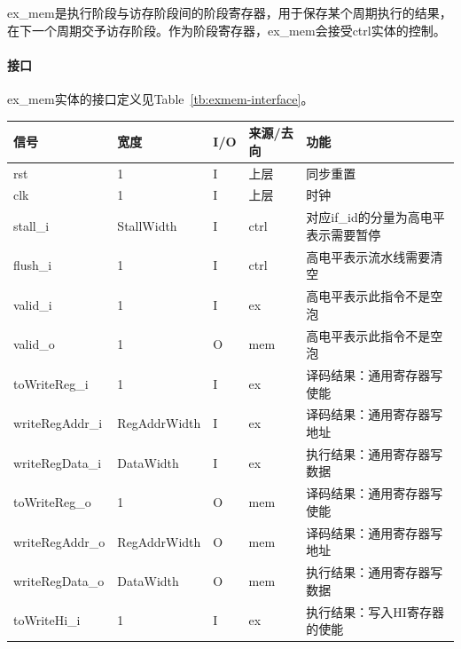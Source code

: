 \documentclass{article}
\begin{document}
\begin{spacing}{1.4}
ex\_mem是执行阶段与访存阶段间的阶段寄存器，用于保存某个周期执行的结果，在下一个周期交予访存阶段。作为阶段寄存器，ex\_mem会接受ctrl实体的控制。

\paragraph{接口}\mbox{}

ex\_mem实体的接口定义见Table~\ref{tb:exmem-interface}。
\begin{longtable}{l|l|l|l|p{5cm}}
\hline
\textbf{信号}&\textbf{宽度}&\textbf{I/O}&\textbf{来源/去向}&\textbf{功能} \\
\hline \endhead rst            & 1                      & I     & 上层          & 同步重置 \\
\hline clk                     & 1                      & I     & 上层          & 时钟 \\
\hline stall\_i                & StallWidth             & I     & ctrl          & 对应if\_id的分量为高电平表示需要暂停 \\
\hline flush\_i                & 1                      & I     & ctrl          & 高电平表示流水线需要清空 \\
\hline valid\_i                & 1                      & I     & ex            & 高电平表示此指令不是空泡 \\
\hline valid\_o                & 1                      & O     & mem           & 高电平表示此指令不是空泡 \\
\hline toWriteReg\_i           & 1                      & I     & ex            & 译码结果：通用寄存器写使能 \\
\hline writeRegAddr\_i         & RegAddrWidth           & I     & ex            & 译码结果：通用寄存器写地址 \\
\hline writeRegData\_i         & DataWidth              & I     & ex            & 执行结果：通用寄存器写数据 \\
\hline toWriteReg\_o           & 1                      & O     & mem           & 译码结果：通用寄存器写使能 \\
\hline writeRegAddr\_o         & RegAddrWidth           & O     & mem           & 译码结果：通用寄存器写地址 \\
\hline writeRegData\_o         & DataWidth              & O     & mem           & 执行结果：通用寄存器写数据 \\
\hline toWriteHi\_i            & 1                      & I     & ex            & 执行结果：写入HI寄存器的使能 \\

\end{longtable}
\end{spacing}
\end{document}
